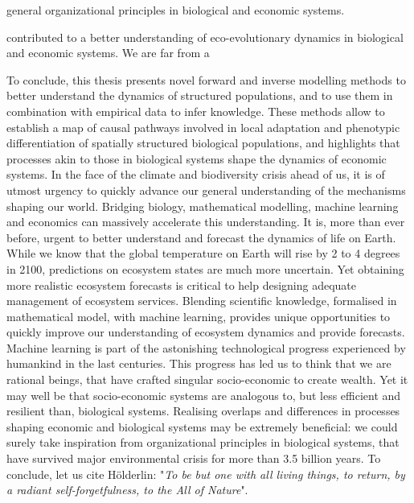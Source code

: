 general organizational principles in biological and economic systems.


contributed to a better understanding of eco-evolutionary dynamics in biological and economic systems.
% 
We are far from a 

To conclude, this thesis presents novel forward and inverse modelling methods to better understand the dynamics of structured populations, and to use them in combination with empirical data to infer knowledge. These methods allow to establish a map of causal pathways involved in local adaptation and phenotypic differentiation of spatially structured biological populations, and highlights that processes akin to those in biological systems shape the dynamics of economic systems. 
% 
In the face of the climate and biodiversity crisis ahead of us, it is of utmost urgency to quickly advance our general understanding of the mechanisms shaping our world.
% 
Bridging biology, mathematical modelling, machine learning and economics can massively accelerate this understanding.
It is, more than ever before, urgent to better understand and forecast the dynamics of life on Earth.
% 
While we know that the global temperature on Earth will rise by 2 to 4 degrees in 2100, predictions on ecosystem states are much more uncertain. Yet obtaining more realistic ecosystem forecasts is critical to help designing adequate management of ecosystem services.
% 
Blending scientific knowledge, formalised in mathematical model, with machine learning, provides unique opportunities to quickly improve our understanding of ecosystem dynamics and provide forecasts. %
% 
Machine learning is part of the astonishing technological progress experienced by humankind in the last centuries. This progress has led us to think that we are rational beings, that have crafted singular socio-economic to create wealth. Yet it may well be that socio-economic systems are analogous to, but less efficient and resilient than, biological systems. 
% 
Realising overlaps and differences in processes shaping economic and biological systems may be extremely beneficial: we could surely take inspiration from organizational principles in biological systems, that have survived major environmental crisis for more than 3.5 billion years.
% 
To conclude, let us cite Hölderlin: "\textit{To be but one with all living things, to return, by a radiant self-forgetfulness, to the All of Nature}". 





